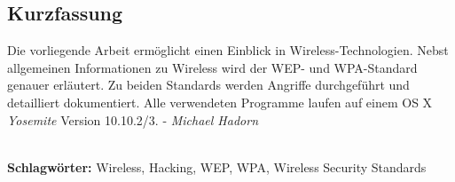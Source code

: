 
\subsection*{Kurzfassung}
Die vorliegende Arbeit ermöglicht einen Einblick in Wireless-Technologien.
Nebst allgemeinen Informationen zu Wireless wird der WEP- und WPA-Standard genauer erläutert.
Zu beiden Standards werden Angriffe durchgeführt und detailliert dokumentiert.
Alle verwendeten Programme laufen auf einem OS X \textit{Yosemite} Version 10.10.2/3.
 - \textit{Michael Hadorn}


%
\mbox{}\\[0.5\baselineskip]\noindent
\textbf{Schlagwörter:} 
Wireless, Hacking, WEP, WPA, Wireless Security Standards
